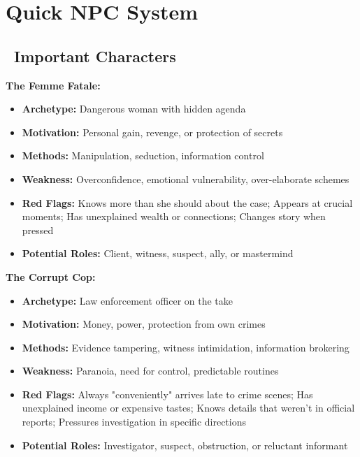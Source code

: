 \documentclass[11pt]{article}
\begin{document}
\newpage

\section{Quick NPC System}

\subsection*{\faUsers\ Important Characters}

\textbf{The Femme Fatale:}
\begin{itemize}
    \item \textbf{Archetype:} Dangerous woman with hidden agenda
    \item \textbf{Motivation:} Personal gain, revenge, or protection of secrets
    \item \textbf{Methods:} Manipulation, seduction, information control
    \item \textbf{Weakness:} Overconfidence, emotional vulnerability, over-elaborate schemes
    \item \textbf{Red Flags:} Knows more than she should about the case; Appears at crucial moments; Has unexplained wealth or connections; Changes story when pressed
    \item \textbf{Potential Roles:} Client, witness, suspect, ally, or mastermind
\end{itemize}

\textbf{The Corrupt Cop:}
\begin{itemize}
    \item \textbf{Archetype:} Law enforcement officer on the take
    \item \textbf{Motivation:} Money, power, protection from own crimes
    \item \textbf{Methods:} Evidence tampering, witness intimidation, information brokering
    \item \textbf{Weakness:} Paranoia, need for control, predictable routines
    \item \textbf{Red Flags:} Always "conveniently" arrives late to crime scenes; Has unexplained income or expensive tastes; Knows details that weren't in official reports; Pressures investigation in specific directions
    \item \textbf{Potential Roles:} Investigator, suspect, obstruction, or reluctant informant
\end{itemize}
\end{document}
